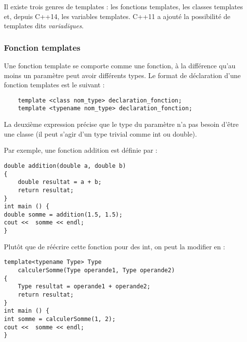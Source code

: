 \documentclass[abstracton]{scrartcl}
\begin{document}
Il existe trois genres de templates : les fonctions templates, les classes templates et, depuis C++14, les variables templates. C++11 a ajouté la possibilité de templates dits \emph{variadiques}.



\subsubsection{Fonction templates}
Une fonction template se comporte comme une fonction, à la différence qu'au moins un paramètre peut avoir différents types. Le format de déclaration d'une fonction templates est le suivant :
\begin{lstlisting}
    template <class nom_type> declaration_fonction;
    template <typename nom_type> declaration_fonction;
\end{lstlisting}

La deuxième expression précise que le type du paramètre n'a pas besoin d'être une classe (il peut s'agir d'un type trivial comme int ou double).

Par exemple, une fonction addition est définie par :
\begin{lstlisting}
double addition(double a, double b)
{
    double resultat = a + b;
    return resultat;
}
int main () {
double somme = addition(1.5, 1.5);
cout <<  somme << endl;
}
\end{lstlisting}

Plutôt que de réécrire cette fonction pour des int, on peut la modifier en :
\begin{lstlisting}
template<typename Type> Type
    calculerSomme(Type operande1, Type operande2)
{
    Type resultat = operande1 + operande2;
    return resultat;
}
int main () {
int somme = calculerSomme(1, 2);
cout <<  somme << endl;
}
\end{lstlisting}
\end{document}
